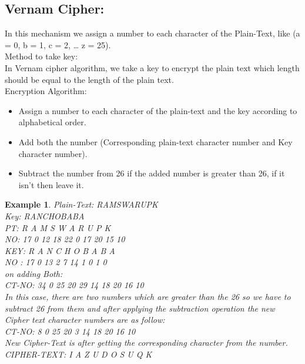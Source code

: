 \documentclass{article}
\newtheorem{ex}{Example}[section]
\begin{document}
\subsection{Vernam Cipher:}
In this mechanism we assign a number to each character of the Plain-Text, like (a = 0, b = 1, c = 2, … z = 25).\\
Method to take key:
\\ In Vernam cipher algorithm, we take a key to encrypt the plain text which length should be equal to the length of the plain text.\\
Encryption Algorithm:
\begin{itemize}
    \item Assign a number to each character of the plain-text and the key according to alphabetical order.
    \item Add both the number (Corresponding plain-text character number and Key character number).
    \item Subtract the number from 26 if the added number is greater than 26, if it isn’t then leave it.
\end{itemize}    
\begin{ex}
Plain-Text: RAMSWARUPK\\
Key: RANCHOBABA\\
PT:   R  A  M   S   W   A  R   U   P   K\\
NO:   17 0  12  18  22  0  17  20  15  10\\
KEY:  R   A  N   C  H  O   B  A  B  A\\ 
NO :  17  0  13  2  7  14  1  0  1  0\\
on adding Both:\\
CT-NO: 34  0  25  20  29  14  18  20  16  10 \\
In this case, there are two numbers which are greater than the 26 so we have to subtract 26 from them and after applying the subtraction operation the new Cipher text character numbers are as follow:\\
CT-NO:  8  0  25   20   3   14   18   20   16   10\\
New Cipher-Text is after getting the corresponding character from the number.\\
CIPHER-TEXT: I  A  Z  U  D  O  S  U  Q  K 
\end{ex}
\end{document}
